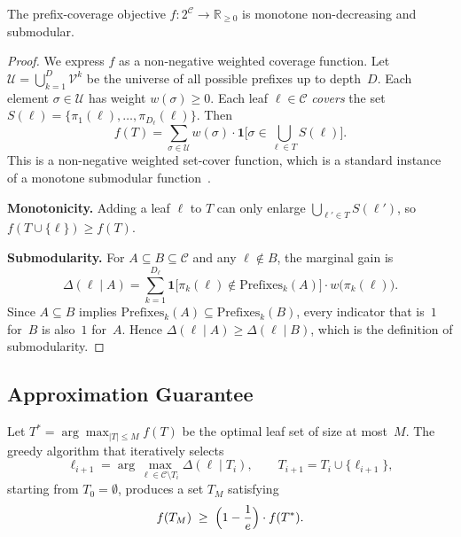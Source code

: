\begin{proposition}
\label{prop:submodular}
The prefix-coverage objective $f \colon 2^{\mathcal{C}} \to \mathbb{R}_{\geq 0}$
is monotone non-decreasing and submodular.
\end{proposition}

\begin{proof}
We express $f$ as a non-negative weighted coverage function.  Let
$\mathcal{U} = \bigcup_{k=1}^{D} \mathcal{V}^k$ be the universe of
all possible prefixes up to depth~$D$.  Each element
$\sigma \in \mathcal{U}$ has weight $w(\sigma) \geq 0$.  Each leaf
$\ell \in \mathcal{C}$ \emph{covers} the set
$S(\ell) = \{\pi_1(\ell), \dots, \pi_{D_\ell}(\ell)\}$.  Then
\[
  f(T)
  = \sum_{\sigma \in \mathcal{U}} w(\sigma)
    \cdot \mathbf{1}\!\bigl[\sigma \in \textstyle\bigcup_{\ell \in T} S(\ell)\bigr].
\]
This is a non-negative weighted set-cover function, which is a standard
instance of a monotone submodular function~\citep{nemhauser1978}.

\textbf{Monotonicity.}\;
Adding a leaf $\ell$ to $T$ can only enlarge
$\bigcup_{\ell' \in T} S(\ell')$, so $f(T \cup \{\ell\}) \geq f(T)$.

\textbf{Submodularity.}\;
For $A \subseteq B \subseteq \mathcal{C}$ and any $\ell \notin B$,
the marginal gain is
\[
  \Delta(\ell \mid A)
  = \sum_{k=1}^{D_\ell}
    \mathbf{1}\!\bigl[\pi_k(\ell) \notin \mathrm{Prefixes}_k(A)\bigr]
    \cdot w\!\bigl(\pi_k(\ell)\bigr).
\]
Since $A \subseteq B$ implies
$\mathrm{Prefixes}_k(A) \subseteq \mathrm{Prefixes}_k(B)$,
every indicator that is~$1$ for~$B$ is also~$1$ for~$A$.
Hence $\Delta(\ell \mid A) \geq \Delta(\ell \mid B)$,
which is the definition of submodularity.
\end{proof}

\subsection{Approximation Guarantee}
\label{sec:guarantee}

\begin{corollary}
\label{cor:greedy}
Let $T^* = \arg\max_{|T| \leq M} f(T)$ be the optimal leaf set of
size at most~$M$.  The greedy algorithm that iteratively selects
\[
  \ell_{i+1}
  = \arg\max_{\ell \in \mathcal{C} \setminus T_i}
    \Delta(\ell \mid T_i),
  \qquad
  T_{i+1} = T_i \cup \{\ell_{i+1}\},
\]
starting from $T_0 = \emptyset$, produces a set $T_M$ satisfying
\[
  f(T_M) \;\geq\; \Bigl(1 - \frac{1}{e}\Bigr) \cdot f(T^*).
\]
\end{corollary}

